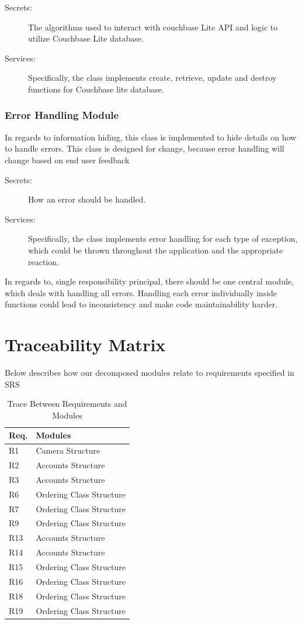 \documentclass[12pt, titlepage]{article}
\begin{document}
\begin{description}
	\item[Secrets:]The algorithms used to interact with couchbase Lite API and logic to utilize Couchbase Lite database.
	\item[Services:] Specifically, the class implements create, retrieve, update and destroy functions for Couchbase lite database.
\end{description}

\subsubsection{Error Handling Module}

In regards to information hiding, this class is implemented to hide details on how to handle errors. This class is designed for change, because error handling will change based on end user feedback

\begin{description}
	\item[Secrets:]How an error should be handled.
	\item[Services:] Specifically, the class implements error handling for each type of exception, which could be thrown throughout the application and the appropriate reaction.
\end{description}

In regards to, single responsibility principal, there should be one central module, which deals with handling all errors. Handling each error individually inside functions could lead to inconsistency and make code maintainability harder. 

\section{Traceability Matrix}
Below describes how our decomposed modules relate to requirements specified in SRS
\begin{table}[H]
\centering
\begin{tabular}{p{} p{}}
\toprule
\textbf{Req.} & \textbf{Modules}\\
\midrule
R1 & Camera Structure\\
R2 & Accounts Structure\\
R3 & Accounts Structure\\
R6 & Ordering Class Structure\\
R7 & Ordering Class Structure\\
R9 & Ordering Class Structure\\
R13 & Accounts Structure \\
R14 & Accounts Structure\\
R15 & Ordering Class Structure\\
R16 & Ordering Class Structure\\
R18 & Ordering Class Structure\\
R19 & Ordering Class Structure\\
\bottomrule
\end{tabular}
\caption{Trace Between Requirements and Modules}
\label{TblRT}
\end{table}
\end{document}
